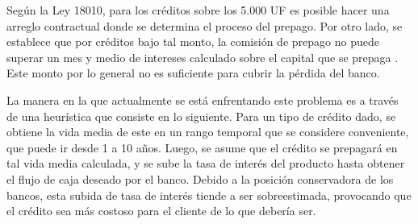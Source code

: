 \qquad Según la Ley 18010, para los créditos sobre los 5.000 UF  es 
posible hacer una arreglo contractual donde se determina el proceso del prepago. Por otro lado, se establece que por créditos bajo tal monto, la comisión de prepago no puede superar un mes y medio de intereses calculado sobre el capital que se prepaga \cite{valdes}. Este monto por lo general no es suficiente para cubrir la pérdida del banco.

\qquad La manera en la que actualmente se está enfrentando este problema es a través de una heurística que consiste en lo siguiente. Para un tipo de crédito dado, se obtiene la vida media de este en un rango temporal que se considere conveniente, que puede ir desde 1 a 10 años. Luego, se asume que el crédito se prepagará en tal vida media calculada, y se sube la tasa de interés del producto hasta obtener el flujo de caja deseado por el banco. Debido a la posición conservadora de los bancos, esta subida de tasa de interés tiende a ser sobreestimada, provocando que el crédito sea más costoso para el cliente de lo que debería ser.